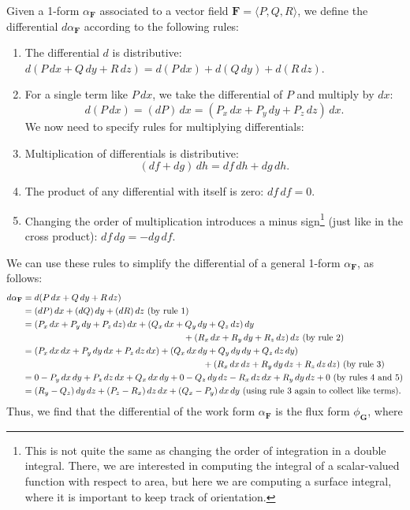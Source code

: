 \documentclass[letterpaper,12pt]{article}
\newcommand{\F}{\mathbf{F}}
\begin{document}
Given a 1-form $\alpha_\F$ associated to a vector field $\F = \langle P,Q,R\rangle$, we define the differential $d\alpha_\F$ according to the following rules:
\begin{enumerate}
\item The differential $d$ is distributive: $d(P\,dx+Q\,dy+R\,dz) = d(P\,dx)+d(Q\,dy)+d(R\,dz)$.
\item For a single term like $P\,dx$, we take the differential of $P$ and multiply by $dx$:
\[
d(P\,dx) = (dP)\,dx = (P_x\,dx+P_y\,dy+P_z\,dz)\,dx.
\]
We now need to specify rules for multiplying differentials:
\item Multiplication of differentials is distributive:
\[
(df+dg)\,dh = df\,dh+dg\,dh.
\]
\item The product of any differential with itself is zero: $df\,df = 0$.
\item Changing the order of multiplication introduces a minus sign\footnote{This is not quite the same as changing the order of integration in a double integral. There, we are interested in computing the integral of a scalar-valued function with respect to area, but here we are computing a surface integral, where it is important to keep track of orientation.} (just like in the cross product): $df\,dg = -dg\,df$.
\end{enumerate}
We can use these rules to simplify the differential of a general 1-form $\alpha_\F$, as follows:
\begin{align*}
d\alpha_\F & = d(P\,dx+Q\,dy+R\,dz)\\
& = (dP)\,dx+(dQ)\,dy+(dR)\,dz \text{ (by rule 1)}\\
& = (P_x\,dx+P_y\,dy+P_z\,dz)\,dx+(Q_x\,dx+Q_y\,dy+Q_z\,dz)\,dy\\
&\hspace{2.5in}+(R_x\,dx+R_y\,dy+R_z\,dz)\,dz \text{ (by rule 2)}\\
& = (P_x\,dx\,dx+P_y\,dy\,dx+P_z\,dz\,dx)+(Q_x\,dx\,dy+Q_y\,dy\,dy+Q_z\,dz\,dy)\\
&\hspace{2.8in}+(R_x\,dx\,dz+R_y\,dy\,dz+R_z\,dz\,dz) \text{ (by rule 3)}\\
& = 0-P_y\,dx\,dy+P_z\,dz\,dx + Q_x\,dx\,dy+0-Q_z\,dy\,dz -R_x\,dz\,dx+R_y\,dy\,dz+0 \text{ (by rules 4 and 5)}\\
& = (R_y-Q_z)\,dy\,dz+(P_z-R_x)\,dz\,dx+(Q_x-P_y)\,dx\,dy \text{ (using rule 3 again to collect like terms)}.
\end{align*}
Thus, we find that the differential of the work form $\alpha_\F$ is the flux form  $\phi_\mathbf{G}$, where 
\end{document}
